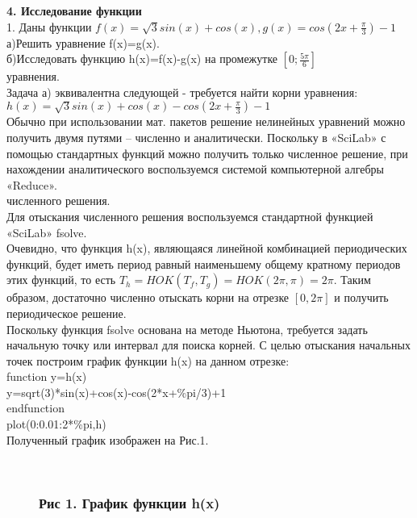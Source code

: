 \documentclass[russian,utf8,nocolumnxxxi,nocolumnxxxii]{eskdtext}
\begin{document}
\newpage
{\bf4. Исследование функции}
\\1. Даны функции $f(x)=\sqrt{3}sin(x)+cos(x),g(x)=cos(2x+\frac{\pi}{3})-1$
\\а)Решить уравнение f(x)=g(x).
\\б)Исследовать функцию h(x)=f(x)-g(x) на промежутке $[0;\frac{5\pi}{6}]$\\
{ уравнения.}\\
Задача а) эквивалентна следующей - требуется найти корни уравнения:\\
$h(x)=\sqrt{3}sin(x)+cos(x)-cos(2x+\frac{\pi}{3})-1$\\
Обычно при использовании мат. пакетов решение нелинейных уравнений можно получить двумя путями – численно и аналитически. Поскольку в «SciLab» с помощью стандартных функций можно получить только численное решение, при нахождении аналитического воспользуемся системой компьютерной алгебры «Reduce».\\
{ численного решения.}\\
Для отыскания численного решения воспользуемся стандартной функцией «SciLab» fsolve.\\
Очевидно, что функция h(x), являющаяся линейной комбинацией периодических функций, будет иметь период равный наименьшему общему кратному периодов этих функций, то есть $T_h=HOK(T_f,T_g)=HOK(2\pi,\pi)=2\pi.$ Таким образом, достаточно численно отыскать корни на отрезке $[0,2\pi]$ и получить периодическое решение. \\
Поскольку функция fsolve основана на методе Ньютона, требуется задать начальную точку или интервал для поиска корней. С целью отыскания начальных точек построим график функции h(x) на данном отрезке:\\
function y=h(x)\\
y=sqrt(3)*sin(x)+cos(x)-cos(2*x+\%pi/3)+1\\
endfunction\\
plot(0:0.01:2*\%pi,h)\\
Полученный график изображен на Рис.1.
\newpage

\begin{figure}[H]
\begin{center}
\begin{minipage}[h]{0.65\linewidth}
  \\
\frametitle{ Рис 1. График функции h(x)}
\end{minipage}
\end{center}
\end{figure}
\end{document}
